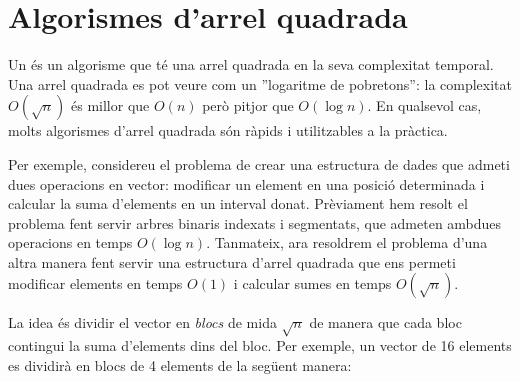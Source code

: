 \chapter{Algorismes d'arrel quadrada}


Un  és un algorisme que té una arrel
quadrada en la seva complexitat temporal. Una arrel quadrada es pot
veure com un ''logaritme de pobretons'': la complexitat $O(\sqrt n)$ és
millor que $O(n)$ però pitjor que $O(\log n)$. En qualsevol cas, molts
algorismes d'arrel quadrada són ràpids i utilitzables a la pràctica.

Per exemple, considereu el problema de crear una estructura de dades
que admeti dues operacions en vector: modificar un element en una
posició determinada i calcular la suma d'elements en un interval
donat. Prèviament hem resolt el problema fent servir arbres binaris
indexats i segmentats, que admeten ambdues operacions en temps $O(\log
n)$. Tanmateix, ara resoldrem el problema d'una altra manera
fent servir una estructura d'arrel quadrada que ens permeti modificar
elements en temps $O(1)$ i calcular sumes en temps $O(\sqrt n)$.

La idea és dividir el vector en \emph{blocs} de mida $\sqrt n$ de
manera que cada bloc contingui la suma d'elements dins del bloc. Per
exemple, un vector de 16 elements es dividirà en blocs de 4 elements
de la següent manera:


\begin{center}
\end{center}


